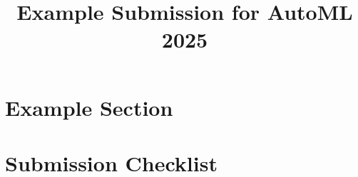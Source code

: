 \documentclass[11pt]{article}
\title{Example Submission for AutoML 2025}
\author[1]{\nameemail{Author 1}{email1@example.com}}
\affil[1]{Institution 1}
\begin{document}
\maketitle

\begin{abstract}
\end{abstract}


\section{Example Section}

\begin{acknowledgements}
\end{acknowledgements}


% 




\newpage
\section*{Submission Checklist}

\end{document}
